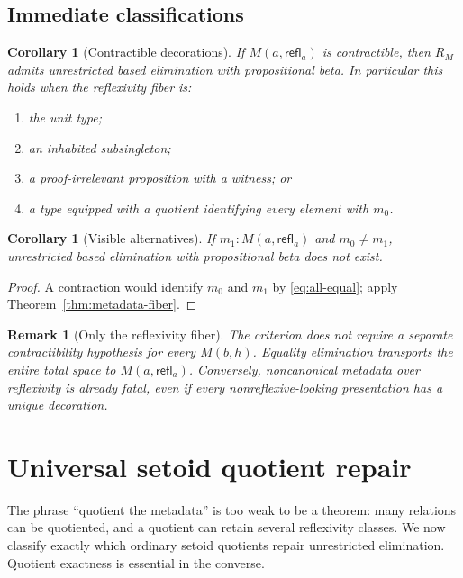 \documentclass[10pt,reqno]{amsart}
\newtheorem{corollary}[theorem]{Corollary}
\newtheorem{remark}[theorem]{Remark}
\newcommand{\refl}{\mathsf{refl}}
\begin{document}
\subsection{Immediate classifications}

\begin{corollary}[Contractible decorations]
\label{cor:contractible-decoration}
If \(M(a,\refl_a)\) is contractible, then \(R_M\) admits unrestricted based
elimination with propositional beta.  In particular this holds when the
reflexivity fiber is:
\begin{enumerate}[label=(\roman*)]
\item the unit type;
\item an inhabited subsingleton;
\item a proof-irrelevant proposition with a witness; or
\item a type equipped with a quotient identifying every element with \(m_0\).
\end{enumerate}
\end{corollary}

\begin{corollary}[Visible alternatives]
\label{cor:visible-alternatives}
If \(m_1:M(a,\refl_a)\) and \(m_0\ne m_1\), unrestricted based elimination
with propositional beta does not exist.
\end{corollary}

\begin{proof}
A contraction would identify \(m_0\) and \(m_1\) by
\eqref{eq:all-equal}; apply Theorem~\ref{thm:metadata-fiber}.
\end{proof}

\begin{remark}[Only the reflexivity fiber]
\label{rem:only-fiber}
The criterion does not require a separate contractibility hypothesis for
every \(M(b,h)\).  Equality elimination transports the entire total space to
\(M(a,\refl_a)\).  Conversely, noncanonical metadata over reflexivity is
already fatal, even if every nonreflexive-looking presentation has a unique
decoration.
\end{remark}

\section{Universal setoid quotient repair}
\label{sec:setoid-repair}

The phrase ``quotient the metadata'' is too weak to be a theorem: many
relations can be quotiented, and a quotient can retain several reflexivity
classes.  We now classify exactly which ordinary setoid quotients repair
unrestricted elimination.  Quotient exactness is essential in the converse.
\end{document}

